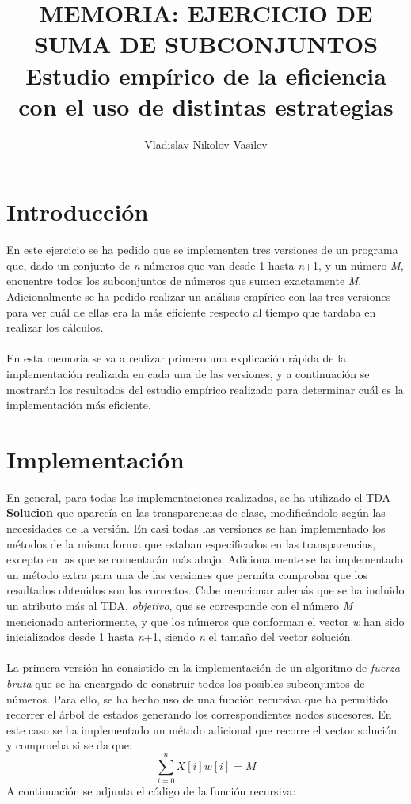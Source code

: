 \documentclass{article}
\title{
	MEMORIA: EJERCICIO DE SUMA DE SUBCONJUNTOS \\ %
	\large Estudio empírico de la eficiencia \\
	con el uso de distintas estrategias}
\author{Vladislav Nikolov Vasilev}
\begin{document}
  \maketitle			  %
  \newpage				  %
  
  \section{Introducción}
  En este ejercicio se ha pedido que se implementen tres versiones de un programa que, dado un conjunto de \textit{n} números que van desde 1 hasta \textit{n}+1, y un número \textit{M}, encuentre todos los subconjuntos de números que sumen exactamente \textit{M}. Adicionalmente se ha pedido realizar un análisis empírico con las tres versiones para ver cuál de ellas era la más eficiente respecto al tiempo que tardaba en realizar los cálculos.\\\\
  En esta memoria se va a realizar primero una explicación rápida de la implementación realizada en cada una de las versiones, y a continuación se mostrarán los resultados del estudio empírico realizado para determinar cuál es la implementación más eficiente.
  
  \section{Implementación}
  En general, para todas las implementaciones realizadas, se ha utilizado el TDA \textbf{Solucion} que aparecía en las transparencias de clase, modificándolo según las necesidades de la versión. En casi todas las versiones se han implementado los métodos de la misma forma que estaban especificados en las transparencias, excepto en las que se comentarán más abajo. Adicionalmente se ha implementado un método extra para una de las versiones que permita comprobar que los resultados obtenidos son los correctos. Cabe mencionar además que se ha incluido un atributo más al TDA, \textit{objetivo}, que se corresponde con el número \textit{M} mencionado anteriormente, y que los números que conforman el vector \textit{w} han sido inicializados desde 1 hasta \textit{n}+1, siendo \textit{n} el tamaño del vector solución.\\\\
  La primera versión ha consistido en la implementación de un algoritmo de \textit{fuerza bruta} que se ha encargado de construir todos los posibles subconjuntos de números. Para ello, se ha hecho uso de una función recursiva que ha permitido recorrer el árbol de estados generando los correspondientes nodos sucesores. En este caso se ha implementado un método adicional que recorre el vector solución y comprueba si se da que:
  \[
  \sum_{i=0}^{n}X[i]w[i]=M
  \]
  A continuación se adjunta el código de la función recursiva:
  
\end{document}
